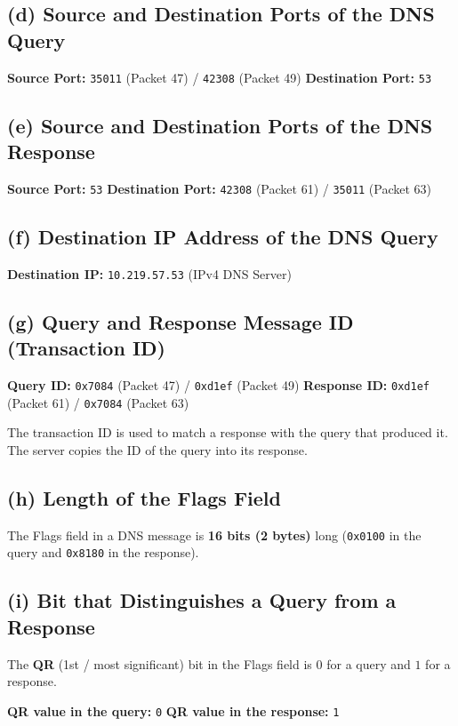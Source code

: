 \documentclass[12pt, a4paper]{report}
\begin{document}
\subsection*{(d) Source and Destination Ports of the DNS Query}
\textbf{Source Port:} \texttt{35011} (Packet 47) / \texttt{42308} (Packet 49) \hfill \textbf{Destination Port:} \texttt{53}

\subsection*{(e) Source and Destination Ports of the DNS Response}
\textbf{Source Port:} \texttt{53} \hfill \textbf{Destination Port:} \texttt{42308} (Packet 61) / \texttt{35011} (Packet 63)

\subsection*{(f) Destination IP Address of the DNS Query}
\textbf{Destination IP:} \texttt{10.219.57.53} (IPv4 DNS Server)

\subsection*{(g) Query and Response Message ID (Transaction ID)}
\textbf{Query ID:} \texttt{0x7084} (Packet 47) / \texttt{0xd1ef} (Packet 49) \hfill \textbf{Response ID:} \texttt{0xd1ef} (Packet 61) / \texttt{0x7084} (Packet 63)

The transaction ID is used to match a response with the query that produced it. The server copies the ID of the query into its response.

\subsection*{(h) Length of the Flags Field}
The Flags field in a DNS message is \textbf{16 bits (2 bytes)} long (\texttt{0x0100} in the query and \texttt{0x8180} in the response).

\subsection*{(i) Bit that Distinguishes a Query from a Response}
The \textbf{QR} (1st / most significant) bit in the Flags field is $0$ for a query and $1$ for a response.

\textbf{QR value in the query:} \texttt{0} \hfill \textbf{QR value in the response:} \texttt{1}
\end{document}
